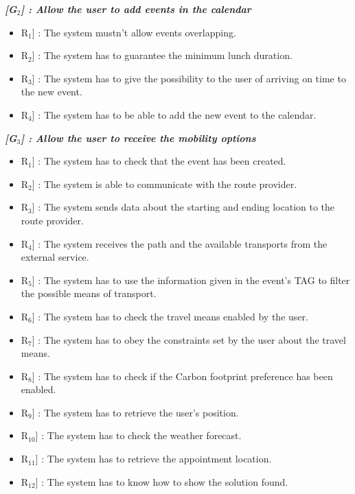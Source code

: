 \vspace{0.5cm}
\noindent
\emph{\textbf{[G$_{2}$] : Allow the user to add events in the calendar}}
\begin{itemize}
	\setlength{\leftskip}{0.5cm}
	\item \lbrack R$_{1}$] : The system mustn’t allow events overlapping.
	\item \lbrack R$_{2}$] : The system has to guarantee the minimum lunch duration.
	\item \lbrack R$_{3}$] : The system has to give the possibility to the user of arriving on time to the new event.
	\item \lbrack R$_{4}$] : The system has to be able to add the new event to the calendar.
\end{itemize}

\vspace{0.5cm}
\noindent
\emph{\textbf{[G$_{3}$] : Allow the user to receive the mobility options}}
\begin{itemize}
	\setlength{\leftskip}{0.5cm}
	\item \lbrack R$_{1}$] : The system has to check that the event has been created.
	\item \lbrack R$_{2}$] : The system is able to communicate with the route provider.
	\item \lbrack R$_{3}$] : The system sends data about the starting and ending location to the route provider.
	\item \lbrack R$_{4}$] : The system receives the path and the available transports from the external service.
	\item \lbrack R$_{5}$] : The system has to use the information given in the event’s TAG to filter the possible means of transport.
	\item \lbrack R$_{6}$] : The system has to check the travel means enabled by the user.
	\item \lbrack R$_{7}$] : The system has to obey the constraints set by the user about the travel means.
	\item \lbrack R$_{8}$] : The system has to check if the Carbon footprint preference has been enabled.
	\item \lbrack R$_{9}$] : The system has to retrieve the user's position.
	\item \lbrack R$_{10}$] : The system has to check the weather forecast.
	\item \lbrack R$_{11}$] : The system has to retrieve the appointment location.
	\item \lbrack R$_{12}$] : The system has to know how to show the solution found.
\end{itemize}


